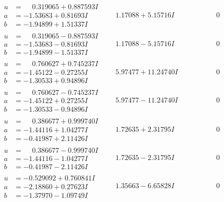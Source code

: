 \documentclass[1p]{elsarticle_modified}
\theoremstyle{definition}
\begin{document}
$$\begin{array}{c|c|c}
\begin{aligned}
u &= \phantom{-}0.319065 + 0.887593 I \\
a &= -1.53683 + 0.81693 I \\
b &= -1.94899 + 1.51337 I\end{aligned}
 & \phantom{-}1.17088 + 5.15716 I & \phantom{-0.000000 } 0 \\ \hline\begin{aligned}
u &= \phantom{-}0.319065 - 0.887593 I \\
a &= -1.53683 - 0.81693 I \\
b &= -1.94899 - 1.51337 I\end{aligned}
 & \phantom{-}1.17088 - 5.15716 I & \phantom{-0.000000 } 0 \\ \hline\begin{aligned}
u &= \phantom{-}0.760627 + 0.745237 I \\
a &= -1.45122 - 0.27255 I \\
b &= -1.30533 + 0.94896 I\end{aligned}
 & \phantom{-}5.97477 + 11.24740 I & \phantom{-0.000000 } 0 \\ \hline\begin{aligned}
u &= \phantom{-}0.760627 - 0.745237 I \\
a &= -1.45122 + 0.27255 I \\
b &= -1.30533 - 0.94896 I\end{aligned}
 & \phantom{-}5.97477 - 11.24740 I & \phantom{-0.000000 } 0 \\ \hline\begin{aligned}
u &= \phantom{-}0.386677 + 0.999740 I \\
a &= -1.44116 + 1.04277 I \\
b &= -0.41987 + 2.11426 I\end{aligned}
 & \phantom{-}1.72635 + 2.31795 I & \phantom{-0.000000 } 0 \\ \hline\begin{aligned}
u &= \phantom{-}0.386677 - 0.999740 I \\
a &= -1.44116 - 1.04277 I \\
b &= -0.41987 - 2.11426 I\end{aligned}
 & \phantom{-}1.72635 - 2.31795 I & \phantom{-0.000000 } 0 \\ \hline\begin{aligned}
u &= -0.529092 + 0.760841 I \\
a &= -2.18860 + 0.27623 I \\
b &= -1.37970 - 1.09749 I\end{aligned}
 & \phantom{-}1.35663 - 6.65828 I & \phantom{-0.000000 } 0 \\ \hline\begin{aligned}

\end{aligned}
\end{array}$$
\end{document}

